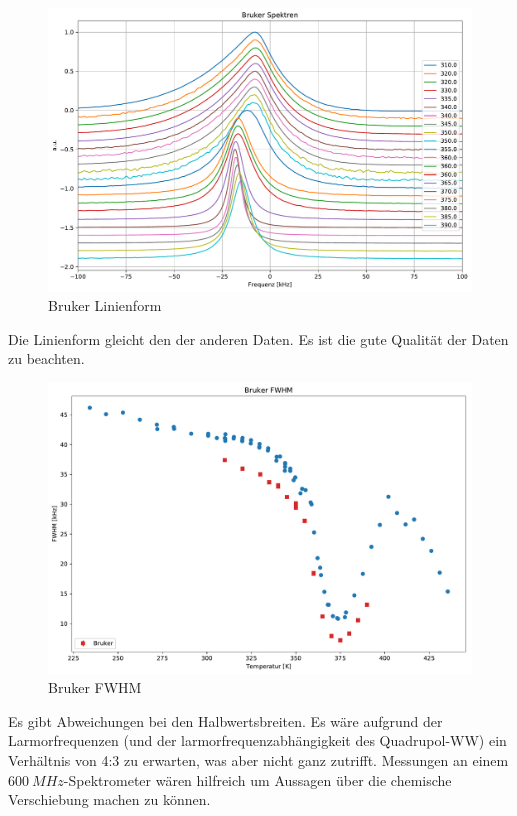 \begin{figure}
	\begin{center}
		\includegraphics[width=\textwidth]{graphics/plots/BRUKER/bruker_lineshape.pdf}
	\end{center}
	\caption{Bruker Linienform} \label{fig:res:bruker_linienform}
\end{figure}
Die Linienform gleicht den der anderen Daten. Es ist die gute Qualität der Daten zu beachten.

\begin{figure}
	\begin{center}
		\includegraphics[width=\textwidth]{graphics/plots/BRUKER/bruker_fwhm.pdf}
	\end{center}
	\caption{Bruker FWHM} \label{fig:res:bruker_fwhm}
\end{figure}
Es gibt Abweichungen bei den Halbwertsbreiten. Es wäre aufgrund der Larmorfrequenzen (und der larmorfrequenzabhängigkeit des Quadrupol-WW) ein Verhältnis von 4:3 zu erwarten, was aber nicht ganz zutrifft. Messungen an einem $\SI{600}{MHz}$-Spektrometer wären hilfreich um Aussagen über die chemische Verschiebung machen zu können.

